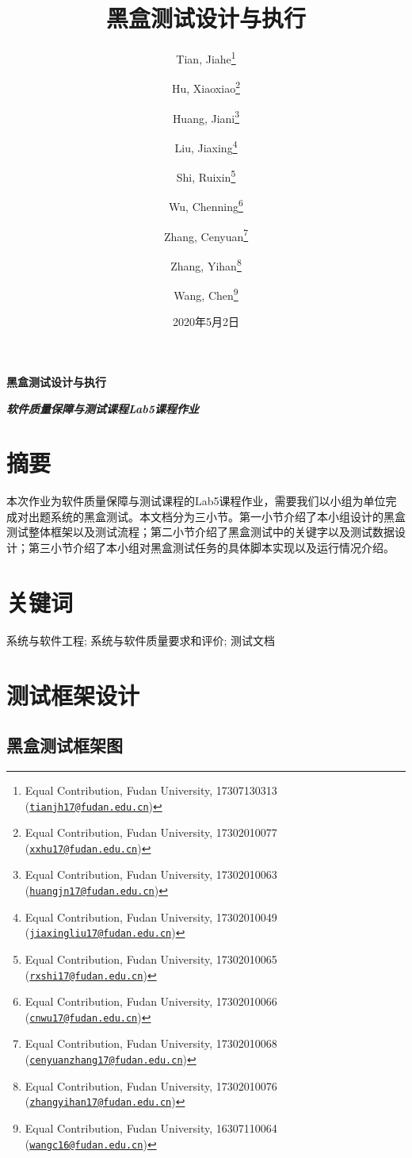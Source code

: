 \documentclass[hyperref, a4paper]{ctexart}
\title{\vspace{2in} 黑盒测试设计与执行\\\vspace{0.5em}{\large 软件质量保障与测试课程Lab5课程作业（第9组）}}
\author{Tian, Jiahe\footnote{Equal Contribution, Fudan University, 17307130313
  (\href{mailto:tianjh17@fudan.edu.cn}{\nolinkurl{tianjh17@fudan.edu.cn}})} \and Hu, Xiaoxiao\footnote{Equal Contribution, Fudan University, 17302010077
  (\href{mailto:xxhu17@fudan.edu.cn}{\nolinkurl{xxhu17@fudan.edu.cn}})} \and Huang, Jiani\footnote{Equal Contribution, Fudan University, 17302010063
  (\href{mailto:huangjn17@fudan.edu.cn}{\nolinkurl{huangjn17@fudan.edu.cn}})} \and Liu, Jiaxing\footnote{Equal Contribution, Fudan University, 17302010049
  (\href{mailto:jiaxingliu17@fudan.edu.cn}{\nolinkurl{jiaxingliu17@fudan.edu.cn}})} \and Shi, Ruixin\footnote{Equal Contribution, Fudan University, 17302010065
  (\href{mailto:rxshi17@fudan.edu.cn}{\nolinkurl{rxshi17@fudan.edu.cn}})} \and Wu, Chenning\footnote{Equal Contribution, Fudan University, 17302010066
  (\href{mailto:cnwu17@fudan.edu.cn}{\nolinkurl{cnwu17@fudan.edu.cn}})} \and Zhang, Cenyuan\footnote{Equal Contribution, Fudan University,
  17302010068
  (\href{mailto:cenyuanzhang17@fudan.edu.cn}{\nolinkurl{cenyuanzhang17@fudan.edu.cn}})} \and Zhang, Yihan\footnote{Equal Contribution, Fudan University, 17302010076
  (\href{mailto:zhangyihan17@fudan.edu.cn}{\nolinkurl{zhangyihan17@fudan.edu.cn}})} \and Wang, Chen\footnote{Equal Contribution, Fudan University, 16307110064
  (\href{mailto:wangc16@fudan.edu.cn}{\nolinkurl{wangc16@fudan.edu.cn}})}}
\date{2020年5月2日}
\begin{document}
\maketitle

\newpage

\LARGE

\begin{center}
\textbf{黑盒测试设计与执行}
\end{center}

\large
\begin{center}
\textbf{\emph{软件质量保障与测试课程Lab5课程作业}}
\end{center}

\hypertarget{ux6458ux8981}{%
\section*{摘要}\label{ux6458ux8981}}

本次作业为软件质量保障与测试课程的Lab5课程作业，需要我们以小组为单位完成对出题系统的黑盒测试。本文档分为三小节。第一小节介绍了本小组设计的黑盒测试整体框架以及测试流程；第二小节介绍了黑盒测试中的关键字以及测试数据设计；第三小节介绍了本小组对黑盒测试任务的具体脚本实现以及运行情况介绍。

\hypertarget{ux5173ux952eux8bcd}{%
\section*{关键词}\label{ux5173ux952eux8bcd}}

系统与软件工程; 系统与软件质量要求和评价; 测试文档

\normalsize

\newpage

\tableofcontents

\newpage

\hypertarget{ux6d4bux8bd5ux6846ux67b6ux8bbeux8ba1}{%
\section{测试框架设计}\label{ux6d4bux8bd5ux6846ux67b6ux8bbeux8ba1}}

\hypertarget{ux9ed1ux76d2ux6d4bux8bd5ux6846ux67b6ux56fe}{%
\subsection{黑盒测试框架图}\label{ux9ed1ux76d2ux6d4bux8bd5ux6846ux67b6ux56fe}}
\end{document}
